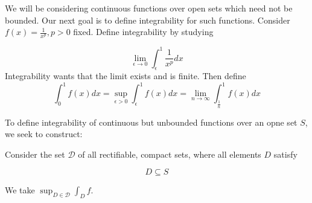 \documentclass[12pt]{article}
\begin{document}
We will be considering continuous functions over open sets which need not be bounded. Our next goal is to define integrability for such functions. Consider $f(x) = \frac{1}{x^p}, p > 0$ fixed. Define integrability by studying

$$\lim_{\epsilon\rightarrow0} \int_\epsilon^1 \frac{1}{x^p} dx$$
Integrability wants that the limit exists and is finite. Then define
$$\int_0^1 f(x)dx = \sup_{\epsilon>0} \int_\epsilon^1 f(x)dx = \lim_{n\rightarrow\infty} \int_{\frac{1}{n}}^1 f(x)dx$$

To define integrability of continuous but unbounded functions over an opne set $S$, we seek to construct:

Consider the set $\mathcal D$ of all rectifiable, compact sets, where all elements $D$ satisfy

$$D \subseteq S$$

We take $\sup_{D \in \mathcal D} \int_D f$.
\end{document}
